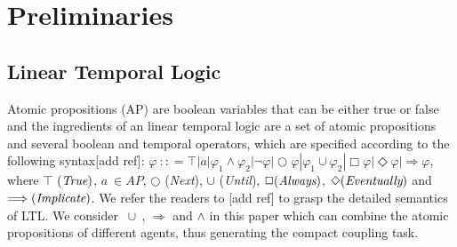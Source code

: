 \documentclass[journal]{IEEEtran}
\begin{document}
%


\section{Preliminaries}

\subsection{Linear Temporal Logic}
Atomic propositions (AP) are boolean variables that can be either true or false and the ingredients of an linear temporal logic are a set of atomic propositions and several boolean and temporal operators, which are specified according to the following syntax[add ref]: $\varphi\ $$:$$:$$=\top|a|\varphi_1\wedge\varphi_2| \neg \varphi|\bigcirc\varphi|\varphi_1\cup\varphi_2|\Box\varphi|\Diamond\varphi|\Longrightarrow\varphi$, where $\top\ (\emph{True})$, $a\ \in AP$, $\bigcirc$ (\emph{Next}), $\cup$ (\emph{Until}), $\Box (\emph{Always})$,  $\Diamond (\emph{Eventually})$ and $\Longrightarrow (\emph{Implicate})$. We refer the readers to [add ref] to grasp the detailed semantics of LTL. We consider $\ \cup\ $, $\Longrightarrow$ and $\wedge$ in this paper which can combine the atomic propositions of different agents, thus generating the compact coupling task.
\end{document}
